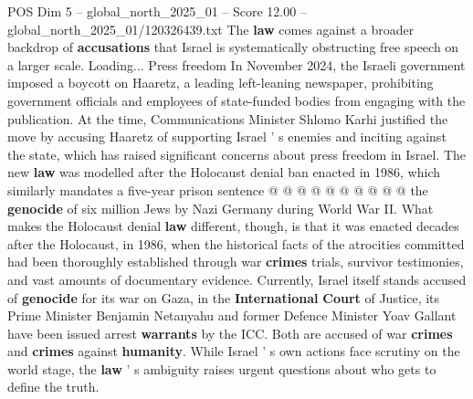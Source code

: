 \begin{textsample}{POS Dim 5 – global\_north\_2025\_01 – Score 12.00 – global\_north\_2025\_01/120326439.txt}
The \textbf{law} comes against a broader backdrop of \textbf{accusations} that Israel is systematically obstructing free speech on a larger scale.
Loading...
Press freedom In November 2024, the Israeli government imposed a boycott on Haaretz, a leading left-leaning newspaper, prohibiting government officials and employees of state-funded bodies from engaging with the publication.
At the time, Communications Minister Shlomo Karhi justified the move by accusing Haaretz of supporting Israel ' s enemies and inciting against the state, which has raised significant concerns about press freedom in Israel.
The new \textbf{law} was modelled after the Holocaust denial ban enacted in 1986, which similarly mandates a five-year prison sentence @ @ @ @ @ @ @ @ @ @ the \textbf{genocide} of six million Jews by Nazi Germany during World War II.
What makes the Holocaust denial \textbf{law} different, though, is that it was enacted decades after the Holocaust, in 1986, when the historical facts of the atrocities committed had been thoroughly established through war \textbf{crimes} trials, survivor testimonies, and vast amounts of documentary evidence.
Currently, Israel itself stands accused of \textbf{genocide} for its war on Gaza, in the \textbf{International} \textbf{Court} of Justice, its Prime Minister Benjamin Netanyahu and former Defence Minister Yoav Gallant have been issued arrest \textbf{warrants} by the ICC.
Both are accused of war \textbf{crimes} and \textbf{crimes} against \textbf{humanity}.
While Israel ' s own actions face scrutiny on the world stage, the \textbf{law} ' s ambiguity raises urgent questions about who gets to define the truth.

\end{textsample}
